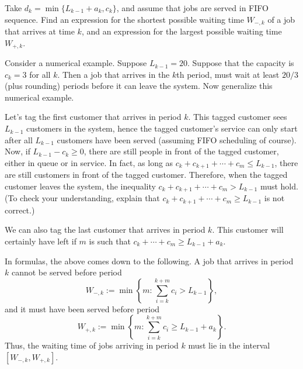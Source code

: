 \begin{exercise}  
Take $d_k = \min\{L_{k-1}+a_k, c_k\}$, and assume that jobs are served in FIFO sequence.
 Find an expression for the shortest possible waiting time $W_{-,k}$ of a job that arrives at time $k$, and an expression for the largest possible waiting time $W_{+,k}$.
\begin{hint}
 Consider a numerical example.
 Suppose $L_{k-1}=20$.
 Suppose that the capacity is $c_k=3$ for all $k$.
 Then a job that arrives in the $k$th period, must wait at least $20/3$ (plus rounding) periods before it can leave the system.
 Now generalize this numerical example.
\end{hint}
\begin{solution}
 Let's tag the first customer that arrives in period $k$.
 This tagged customer sees $L_{k-1}$ customers in the system, hence the tagged customer's service can only start after all $L_{k-1}$ customers have been served (assuming FIFO scheduling of course).
 Now, if $L_{k-1}-c_k \geq 0$, there are still people in front of the tagged customer, either in queue or in service.
 In fact, as long as $c_k+c_{k+1}+\cdots +c_m \leq L_{k-1}$, there are still customers in front of the tagged customer.
 Therefore, when the tagged customer leaves the system, the inequality $c_k+c_{k+1}+\cdots +c_m > L_{k-1}$ must hold.
 (To check your understanding, explain that $c_k+c_{k+1}+\cdots +c_m \geq L_{k-1}$ is not correct.)

 We can also tag the last customer that arrives in period $k$.
 This customer will certainly have left if $m$ is such that $c_k+\cdots+c_m \geq L_{k-1}+a_k$.

 In formulas, the above comes down to the following.
 A job that arrives in period $k$ cannot be served before period
 \begin{equation*}
 W_{-,k}:= \min\left\{m: \sum_{i=k}^{k+m} c_i > L_{k-1}\right\},
 \end{equation*}
 and it must have been served before period
 \begin{equation*}
 W_{+,k}:= \min\left\{m: \sum_{i=k}^{k+m} c_i \geq
 L_{k-1}+a_k\right\}.
 \end{equation*}
 Thus, the waiting time of jobs arriving in period $k$ must lie in
 the interval $[W_{-,k}, W_{+,k}]$.
\end{solution}
\end{exercise}

